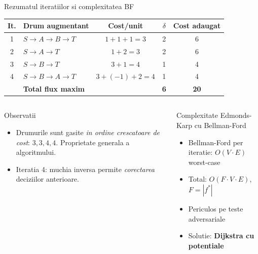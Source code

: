 ﻿\documentclass[9pt]{beamer}
\begin{document}
\begin{frame}[shrink]{Rezumatul iteratiilor si complexitatea BF}
  \begin{center}
  \begin{tabular}{@{}clccc@{}}
    \toprule
    \textbf{It.} & \textbf{Drum augmentant} & \textbf{Cost/unit} & \textbf{$\delta$} & \textbf{Cost adaugat}\\
    \midrule
    1 & $S\to A\to B\to T$ & $1+1+1=3$ & 2 & 6\\
    2 & $S\to A\to T$ & $1+2=3$ & 2 & 6\\
    3 & $S\to B\to T$ & $3+1=4$ & 1 & 4\\
    4 & $S\to B\to A\to T$ & $3+(-1)+2=4$ & 1 & 4\\
    \midrule
    & \textbf{Total flux maxim} & & \textbf{6} & \textbf{20}\\
    \bottomrule
  \end{tabular}
  \end{center}
  \smallskip
  \begin{columns}[T]
    \begin{block}{Observatii}
      \begin{footnotesize}
      \begin{itemize}
        \item Drumurile sunt gasite \textit{in ordine crescatoare de cost}:
              $3, 3, 4, 4$. Proprietate generala a algoritmului.
        \item Iteratia 4: muchia inversa permite
              \textit{corectarea} deciziilor anterioare.
      \end{itemize}
      \end{footnotesize}
    \end{block}
    \begin{alertblock}{Complexitate Edmonds-Karp cu Bellman-Ford}
      \begin{footnotesize}
      \begin{itemize}
        \item Bellman-Ford per iteratie: $O(V\!\cdot\! E)$ worst-case
        \item Total: $O(F\!\cdot\! V\!\cdot\! E)$, $F=|f^*|$
        \item Periculos pe teste adversariale
        \item Solutie: \textbf{Dijkstra cu potentiale}
      \end{itemize}
      \end{footnotesize}
    \end{alertblock}
  \end{columns}
\end{frame}
\end{document}
